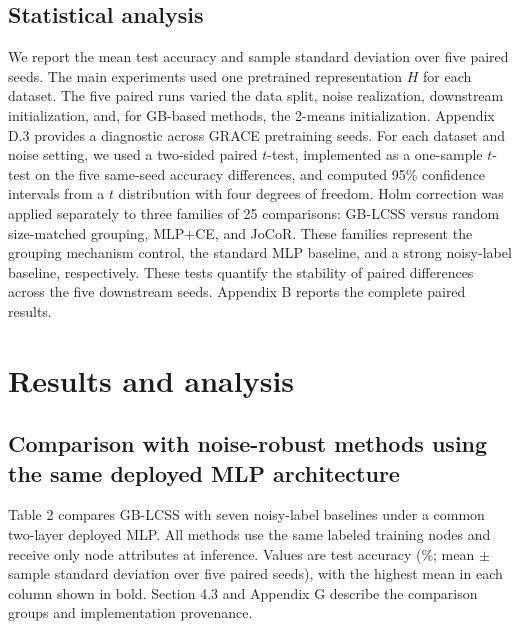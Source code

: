 \documentclass[10pt,letterpaper]{elsarticle}
\begin{document}
\subsection{Statistical analysis}\label{sec:4.5}

We report the mean test accuracy and sample standard deviation over five paired seeds. The main experiments used one pretrained representation \(H\) for each dataset. The five paired runs varied the data split, noise realization, downstream initialization, and, for GB-based methods, the 2-means initialization. Appendix D.3 provides a diagnostic across GRACE pretraining seeds. For each dataset and noise setting, we used a two-sided paired \(t\)-test, implemented as a one-sample \(t\)-test on the five same-seed accuracy differences, and computed 95\% confidence intervals from a \(t\) distribution with four degrees of freedom. Holm correction was applied separately to three families of 25 comparisons: GB-LCSS versus random size-matched grouping, MLP+CE, and JoCoR. These families represent the grouping mechanism control, the standard MLP baseline, and a strong noisy-label baseline, respectively. These tests quantify the stability of paired differences across the five downstream seeds. Appendix B reports the complete paired results.

\Needspace{418pt}

\FloatBarrier

\section{Results and analysis}\label{sec:5}

\Needspace{403pt}

\subsection{Comparison with noise-robust methods using the same deployed MLP architecture}\label{sec:5.1}

Table 2 compares GB-LCSS with seven noisy-label baselines under a common two-layer deployed MLP. All methods use the same labeled training nodes and receive only node attributes at inference. Values are test accuracy (\%; mean \ensuremath{\pm} sample standard deviation over five paired seeds), with the highest mean in each column shown in bold. Section 4.3 and Appendix G describe the comparison groups and implementation provenance.
\end{document}

